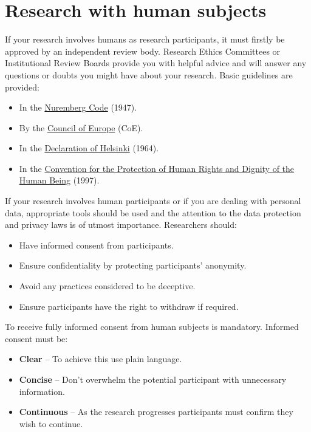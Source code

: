 \documentclass[
]{book}
\begin{document}
\hypertarget{research-with-human-subjects}{%
\section{Research with human subjects}\label{research-with-human-subjects}}

If your research involves humans as research participants, it must firstly be approved by an independent review body. Research Ethics Committees or Institutional Review Boards provide you with helpful advice and will answer any questions or doubts you might have about your research. Basic guidelines are provided:

\begin{itemize}
\item
  In the \href{https://en.wikipedia.org/wiki/Nuremberg_Code}{Nuremberg Code} (1947).
\item
  By the \href{https://www.coe.int/en/web/portal}{Council of Europe} (CoE).
\item
  In the \href{https://www.wma.net/policies-post/wma-declaration-of-helsinki-ethical-principles-for-medical-research-involving-human-subjects/\#:~:text=1.,identifiable\%20human\%20material\%20and\%20data.}{Declaration of Helsinki} (1964).
\item
  In the \href{https://docs.google.com/document/u/0/d/1oUTVCqSzDajLWZAlSkFwHX8XZrolNDDayX1I3OtkzRs/edit}{Convention for the Protection of Human Rights and Dignity of the Human Being} (1997).
\end{itemize}

If your research involves human participants or if you are dealing with personal data, appropriate tools should be used and the attention to the data protection and privacy laws is of utmost importance. Researchers should:

\begin{itemize}
\item
  Have informed consent from participants.
\item
  Ensure confidentiality by protecting participants' anonymity.
\item
  Avoid any practices considered to be deceptive.
\item
  Ensure participants have the right to withdraw if required.
\end{itemize}

To receive fully informed consent from human subjects is mandatory. Informed consent must be:

\begin{itemize}
\item
  \textbf{Clear} -- To achieve this use plain language.
\item
  \textbf{Concise} -- Don't overwhelm the potential participant with unnecessary information.
\item
  \textbf{Continuous} -- As the research progresses participants must confirm they wish to continue.
\end{itemize}
\end{document}
